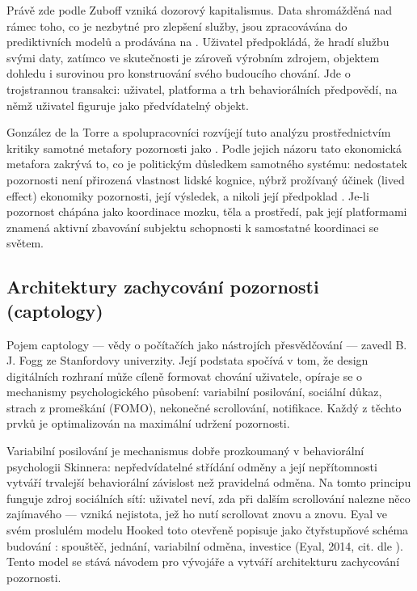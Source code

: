 Právě zde podle Zuboff vzniká dozorový kapitalismus.
Data shromážděná nad rámec toho, co je nezbytné pro zlepšení služby, jsou zpracovávána do prediktivních modelů a prodávána na  \parencite{Zuboff19}.
Uživatel předpokládá, že hradí službu svými daty, zatímco ve skutečnosti je zároveň výrobním zdrojem, objektem dohledu i surovinou pro konstruování svého budoucího chování.
Jde o trojstrannou transakci: uživatel, platforma a trh behaviorálních předpovědí, na němž uživatel figuruje jako předvídatelný objekt.

González de la Torre a spolupracovníci rozvíjejí tuto analýzu prostřednictvím kritiky samotné metafory pozornosti jako .
Podle jejich názoru tato ekonomická metafora zakrývá to, co je politickým důsledkem samotného systému: nedostatek pozornosti není přirozená vlastnost lidské kognice, nýbrž prožívaný účinek (lived effect) ekonomiky pozornosti, její výsledek, a nikoli její předpoklad \parencite{GonzalezDeLaTorre24}. Je-li pozornost chápána jako koordinace mozku, těla a prostředí, pak její  platformami znamená aktivní zbavování subjektu schopnosti k samostatné koordinaci se světem.

\subsection{Architektury zachycování pozornosti (captology)}

Pojem captology — vědy o počítačích jako nástrojích přesvědčování — zavedl B. J. Fogg ze Stanfordovy univerzity.
Její podstata spočívá v tom, že design digitálních rozhraní může cíleně formovat chování uživatele, opíraje se o mechanismy psychologického působení: variabilní posilování, sociální důkaz, strach z promeškání (FOMO), nekonečné scrollování, notifikace. Každý z těchto prvků je optimalizován na maximální udržení pozornosti.

Variabilní posilování je mechanismus dobře prozkoumaný v behaviorální psychologii Skinnera: nepředvídatelné střídání odměny a její nepřítomnosti vytváří trvalejší behaviorální závislost než pravidelná odměna.
Na tomto principu funguje zdroj sociálních sítí: uživatel neví, zda při dalším scrollování nalezne něco zajímavého — vzniká nejistota, jež ho nutí scrollovat znovu a znovu. Eyal ve svém proslulém modelu Hooked toto otevřeně popisuje jako čtyřstupňové schéma budování : spouštěč, jednání, variabilní odměna, investice (Eyal, 2014, cit. dle \parencite{GonzalezDeLaTorre24}). Tento model se stává návodem pro vývojáře a vytváří architekturu zachycování pozornosti.

